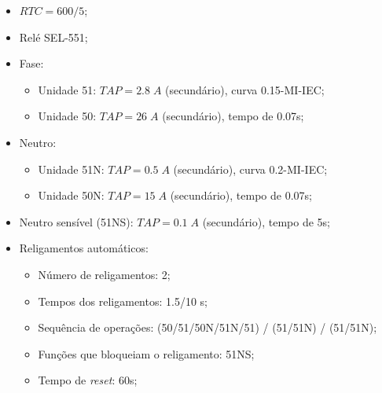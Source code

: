 \begin{enumerate}[(a)]
    \begin{itemize}
        \item $RTC = 600/5$; 
        \item Relé SEL-551;
        \item Fase:
        \begin{itemize}
            \item Unidade 51: $TAP = 2.8 \; A$ (secundário), curva 0.15-MI-IEC;
            \item Unidade 50: $TAP = 26 \; A$ (secundário), tempo de 0.07s;
        \end{itemize}
        \item Neutro:
        \begin{itemize}
            \item Unidade 51N: $TAP = 0.5 \; A$ (secundário), curva 0.2-MI-IEC;
            \item Unidade 50N: $TAP = 15 \; A$ (secundário), tempo de 0.07s;
        \end{itemize}
        \item Neutro sensível (51NS):  $TAP = 0.1 \; A$ (secundário), tempo de 5s;
        \item Religamentos automáticos:
        \begin{itemize}
            \item Número de religamentos: 2;
            \item Tempos dos religamentos: 1.5/10 s;
            \item Sequência de operações: (50/51/50N/51N/51) / (51/51N) / (51/51N);
            \item Funções que bloqueiam o religamento: 51NS;
            \item Tempo de \textit{reset}: 60s; 
        \end{itemize}
    \end{itemize}
    
    
\end{enumerate}